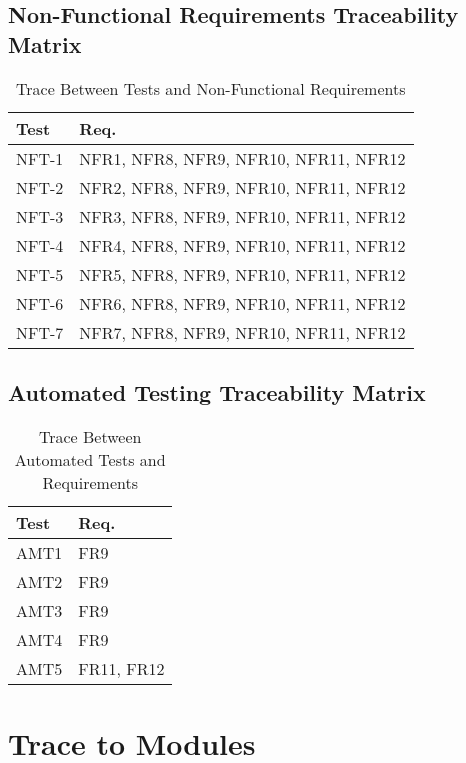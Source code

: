 \documentclass[12pt, titlepage]{article}
\begin{document}
\newpage

\subsection{Non-Functional Requirements Traceability Matrix}
\begin{table}[H]
\centering
\begin{tabular}{p{} p{}}
\toprule
\textbf{Test} & \textbf{Req.}\\
\midrule
NFT-1 & NFR1, NFR8, NFR9, NFR10, NFR11, NFR12\\
NFT-2 & NFR2, NFR8, NFR9, NFR10, NFR11, NFR12\\
NFT-3 & NFR3, NFR8, NFR9, NFR10, NFR11, NFR12\\
NFT-4 & NFR4, NFR8, NFR9, NFR10, NFR11, NFR12\\
NFT-5 & NFR5, NFR8, NFR9, NFR10, NFR11, NFR12\\
NFT-6 & NFR6, NFR8, NFR9, NFR10, NFR11, NFR12\\
NFT-7 & NFR7, NFR8, NFR9, NFR10, NFR11, NFR12\\
\bottomrule
\end{tabular}
\caption{Trace Between Tests and Non-Functional Requirements}
\label{TblTNFR}
\end{table}

\newpage

\subsection{Automated Testing Traceability Matrix}
\begin{table}[H]
\centering
\begin{tabular}{p{} p{}}
\toprule
\textbf{Test} & \textbf{Req.}\\
\midrule
AMT1 & FR9\\
AMT2 & FR9\\
AMT3 & FR9\\
AMT4 & FR9\\
AMT5 & FR11, FR12\\
\bottomrule
\end{tabular}
\caption{Trace Between Automated Tests and Requirements}
\label{TblTATR}
\end{table}

\newpage

\section{Trace to Modules}
\end{document}
